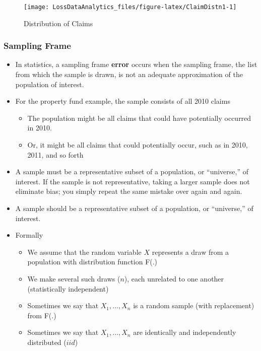 \documentclass[]{book}
\theoremstyle{definition}
\theoremstyle{definition}
\theoremstyle{definition}
\theoremstyle{remark}
\begin{document}
\begin{figure}

{\centering \texttt{[image: LossDataAnalytics\_files/figure-latex/ClaimDistn1-1]} 

}

\caption{Distribution of Claims}\label{fig:ClaimDistn1}
\end{figure}

\subsubsection{Sampling Frame}\label{sampling-frame}

\begin{itemize}
\item
  In statistics, a sampling frame \textbf{error} occurs when the
  sampling frame, the list from which the sample is drawn, is not an
  adequate approximation of the population of interest.
\item
  For the property fund example, the sample consists of all 2010 claims

  \begin{itemize}
  \item
    The population might be all claims that could have potentially
    occurred in 2010.
  \item
    Or, it might be all claims that could potentially occur, such as in
    2010, 2011, and so forth
  \end{itemize}
\item
  A sample must be a representative subset of a population, or
  ``universe,'' of interest. If the sample is not representative, taking
  a larger sample does not eliminate bias; you simply repeat the same
  mistake over again and again.
\item
  A sample should be a representative subset of a population, or
  ``universe,'' of interest.
\item
  Formally

  \begin{itemize}
  \item
    We assume that the random variable \(X\) represents a draw from a
    population with distribution function F(.)
  \item
    We make several such draws (\(n\)), each unrelated to one another
    (statistically independent)
  \item
    Sometimes we say that \(X_1, \ldots, X_n\) is a random sample (with
    replacement) from F(.)
  \item
    Sometimes we say that \(X_1, \ldots, X_n\) are identically and
    independently distributed (\(iid\))
  \end{itemize}
\end{itemize}
\end{document}
